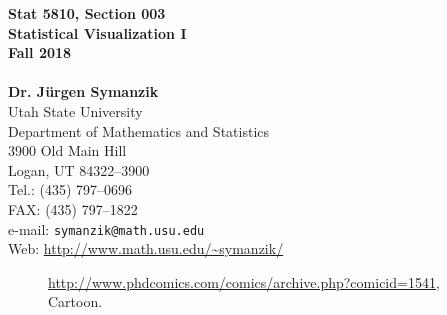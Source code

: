 \documentclass[12pt,letterpaper,final]{article}\usepackage[]{graphicx}\usepackage[]{color}
\begin{document}




\begin{titlepage}
\vspace*{4.5cm}
\begin{center}
{\LARGE \bf Stat 5810, Section 003} \\[0.5cm]
{\LARGE \bf Statistical Visualization I} \\[0.5cm]
{\LARGE \bf Fall 2018} \\[0.5cm]
~ \\[2cm]
{\bf Dr. J\"urgen Symanzik} \\[0.3cm]
Utah State University \\[0.3cm]
Department of Mathematics and Statistics \\[0.3cm]
3900 Old Main Hill \\[0.3cm]
Logan, UT 84322--3900 \\[0.8cm]
Tel.: (435) 797--0696 \\[0.3cm]
FAX: (435) 797--1822 \\[0.3cm]
e-mail: \verb|symanzik@math.usu.edu| \\[0.3cm]
Web: \url{http://www.math.usu.edu/~symanzik/}
\end{center}

\thispagestyle{empty}
\vfill
\end{titlepage}

\newpage

\thispagestyle{empty}

\vspace*{5cm}

\begin{figure}[ht]
\caption{\label{PhdcomicsCom_Plotting}
\url{http://www.phdcomics.com/comics/archive.php?comicid=1541}, \\
Cartoon.
}
\end{figure}


\newpage


\setcounter{page}{1}

\tableofcontents

\newpage

%


\newpage


\setcounter{page}{1}

%
\end{document}
